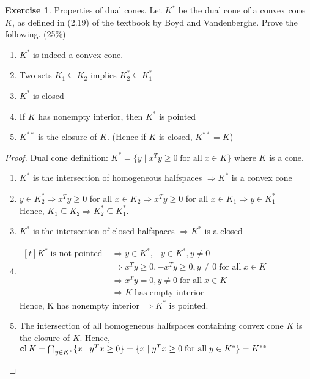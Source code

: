 \documentclass[12pt]{extarticle}
\theoremstyle{definition}
\newtheorem{exercise}{Exercise}
\begin{document}
\begin{exercise}
  Properties of dual cones. Let $K^\ast$ be the dual cone of a convex cone $K$, as defined in (2.19) of the textbook by Boyd and Vandenberghe. Prove the following. (25\%)
  \begin{enumerate}[label=(\alph*)]
    \item $K^\ast$ is indeed a convex cone.
    \item Two sets $K_1 \subseteq K_2$ implies $K_2^\ast \subseteq K_1^\ast$
    \item $K^\ast$ is closed
    \item If $K$ has nonempty interior, then $K^\ast$ is pointed
    \item $K^{\ast\ast}$ is the closure of $K$. (Hence if $K$ is closed, $K^{\ast\ast}=K$)
  \end{enumerate}
\end{exercise}
\begin{proof}
  Dual cone definition: $K^\ast=\{y\mid x^Ty\ge 0\;\text{for all}\;x\in K\}$ where $K$ is a cone.
  \begin{enumerate}[label=(\alph*)]
    \item $K^\ast$ is the intersection of homogeneous halfspaces $\Rightarrow K^\ast$ is a convex cone
    \item $y\in K_2^\ast\Rightarrow x^Ty\ge 0$ for all $x\in K_2\Rightarrow x^Ty\ge 0$ for all $x\in K_1\Rightarrow y\in K_1^\ast$\\
          Hence, $K_1 \subseteq K_2\Rightarrow K_2^\ast \subseteq K_1^\ast$.
    \item $K^\ast$ is the intersection of closed halfspaces $\Rightarrow K^\ast$ is a closed
    \item $\begin{aligned}[t]
            K^\ast\;\text{is not pointed}\;
                &\Rightarrow y\in K^\ast, -y\in K^\ast, y\ne 0\\
                &\Rightarrow x^Ty\ge 0, -x^Ty\ge 0, y\ne 0\;\text{for all}\;x\in K\\
                &\Rightarrow x^Ty=0, y\ne 0\;\text{for all}\;x\in K\\
                &\Rightarrow K\;\text{has empty interior}
            \end{aligned}$\\
          Hence, K has nonempty interior $\Rightarrow K^\ast$ is pointed.
    \item The intersection of all homogeneous halfspaces containing convex cone $K$ is the closure of $K$. Hence,\\
          $\mathop{\bf cl} K=\bigcap_{y\in K^\ast}\{x\mid y^Tx\ge 0\}=\{x\mid y^Tx\ge 0\;\text{for all}\;y\in K^\ast\}=K^{\ast\ast}$\qedhere
  \end{enumerate}
\end{proof}
\end{document}
